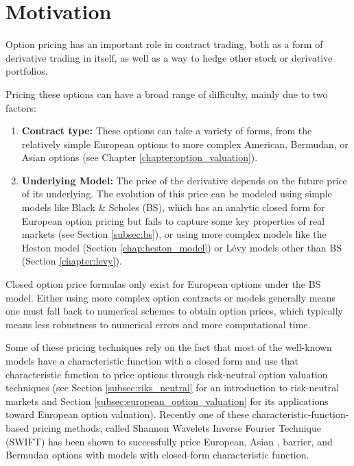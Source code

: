\documentclass[12,twoside]{mammeTFM}
\theoremstyle{definition}
\theoremstyle{remark}
\begin{document}
\maketitle

\tableofcontents

\pagebreak


\section{Motivation}

Option pricing has an important role in contract trading, both as a form of derivative trading in itself, as well as a way to hedge other stock or derivative portfolios.

Pricing these options can have a broad range of difficulty, mainly due to two factors:
\begin{enumerate}
\item \textbf{Contract type:} These options can take a variety of forms, from the relatively simple European options to more complex American, Bermudan, or Asian options (see Chapter \ref{chapter:option_valuation}).
\item \textbf{Underlying Model: } The price of the derivative depends on the future price of its underlying. The evolution of this price can be modeled using simple models like Black \& Scholes (BS), which has an analytic closed form for European option pricing but fails to capture some key properties of real markets (see Section \ref{subsec:bs}), or using more complex models like the Heston model (Section \ref{chap:heston_model}) or L\'evy models other than BS (Section \ref{chapter:levy}).
\end{enumerate}

Closed option price formulas only exist for European options under the BS model. Either using more complex option contracts or models generally means one must fall back to numerical schemes to obtain option prices, which typically means less robustness to numerical errors and more computational time.

Some of these pricing techniques rely on the fact that most of the well-known models have a characteristic function with a closed form and use that characteristic function to price options through risk-neutral option valuation techniques (see Section \ref{subsec:riks_neutral} for an introduction to risk-neutral markets and Section \ref{subsec:european_option_valuation} for its applications toward European option valuation). Recently one of these characteristic-function-based pricing methods, called Shannon Wavelets Inverse Fourier Technique (SWIFT) \cite{Ortiz-Gracia2016} has been shown to successfully price European, Asian \cite{lei18}, barrier, and Bermudan options \cite{mar17} with models with closed-form characteristic function.
\end{document}
